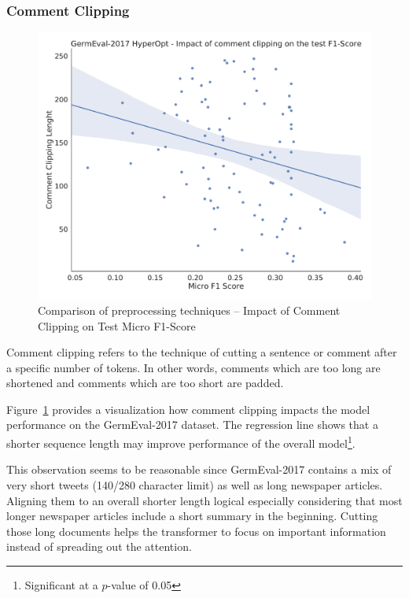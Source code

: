 \subsubsection{Comment Clipping}
\label{subsec:06_CommentClipping}

\begin{figure}
	\centering
	\includegraphics[width=\textwidth]{figures/06_results/06_hp_ge_lm_commentClipping_test}
	\caption{Comparison of preprocessing techniques -- Impact of Comment Clipping on Test Micro F1-Score}
	\label{fig:06_PreprocessingCommentClipping}
\end{figure}

Comment clipping refers to the technique of cutting a sentence or comment after a specific number of tokens. In other words, comments which are too long are shortened and comments which are too short are padded.

Figure~\ref{fig:06_PreprocessingCommentClipping} provides a visualization how comment clipping impacts the model performance on the GermEval-2017 dataset. The regression line shows that a shorter sequence length may improve performance of the overall model\footnote{Significant at a $p$-value of 0.05}.
\medskip

This observation seems to be reasonable since GermEval-2017 contains a mix of very short tweets {(140/280 character limit)} as well as long newspaper articles. Aligning them to an overall shorter length logical especially considering that most longer newspaper articles include a short summary in the beginning. Cutting those long documents helps the transformer to focus on important information instead of spreading out the attention.

